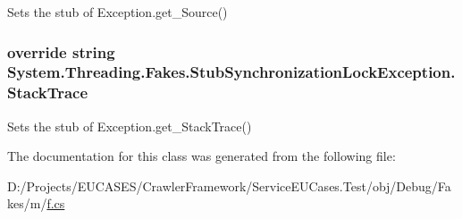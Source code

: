 Sets the stub of Exception.\-get\-\_\-\-Source()

\hypertarget{class_system_1_1_threading_1_1_fakes_1_1_stub_synchronization_lock_exception_abc4aa794b78074f50b56e0edbd8adc58}{
\subsubsection[{Stack\-Trace}]{\setlength{\rightskip}{0pt plus 5cm}override string System.\-Threading.\-Fakes.\-Stub\-Synchronization\-Lock\-Exception.\-Stack\-Trace\hspace{0.3cm}{\ttfamily [get]}}}\label{class_system_1_1_threading_1_1_fakes_1_1_stub_synchronization_lock_exception_abc4aa794b78074f50b56e0edbd8adc58}


Sets the stub of Exception.\-get\-\_\-\-Stack\-Trace()



The documentation for this class was generated from the following file\-:\begin{DoxyCompactItemize}
\item 
D\-:/\-Projects/\-E\-U\-C\-A\-S\-E\-S/\-Crawler\-Framework/\-Service\-E\-U\-Cases.\-Test/obj/\-Debug/\-Fakes/m/\hyperlink{m_2f_8cs}{f.\-cs}\end{DoxyCompactItemize}
